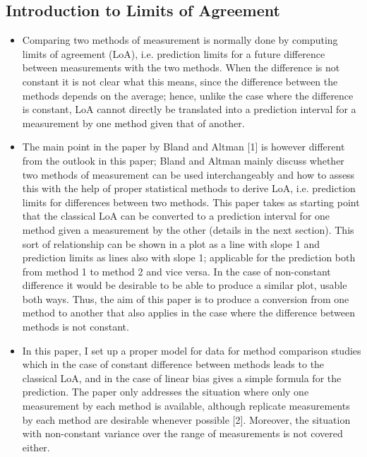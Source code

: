 \documentclass[12pt, a4paper]{report}
\begin{document}
\subsection{Introduction to Limits of Agreement}
\begin{itemize}
	\item Comparing two methods of measurement is normally done by computing limits of agreement (LoA), i.e. prediction limits for
	a future difference between measurements with the two methods. When the difference is not constant it is not clear what
	this means, since the difference between the methods depends on the average; hence, unlike the case where the difference is
	constant, LoA cannot directly be translated into a prediction interval for a measurement by one method given that of another.
	\item The main point in the paper by Bland and Altman [1] is however different from the outlook in this paper; Bland and Altman
	mainly discuss whether two methods of measurement can be used interchangeably and how to assess this with the help of
	proper statistical methods to derive LoA, i.e. prediction limits for differences between two methods.
	This paper takes as starting point that the classical LoA can be converted to a prediction interval for one method given a
	measurement by the other (details in the next section). This sort of relationship can be shown in a plot as a line with slope 1
	and prediction limits as lines also with slope 1; applicable for the prediction both from method 1 to method 2 and vice versa. In
	the case of non-constant difference it would be desirable to be able to produce a similar plot, usable both ways. Thus, the aim
	of this paper is to produce a conversion from one method to another that also applies in the case where the difference between
	methods is not constant.
	\item In this paper, I set up a proper model for data for method comparison studies which in the case of constant difference between
	methods leads to the classical LoA, and in the case of linear bias gives a simple formula for the prediction. The paper only
	addresses the situation where only one measurement by each method is available, although replicate measurements by each
	method are desirable whenever possible [2]. Moreover, the situation with non-constant variance over the range of measurements
	is not covered either.
\end{itemize}
\newpage
\end{document}
